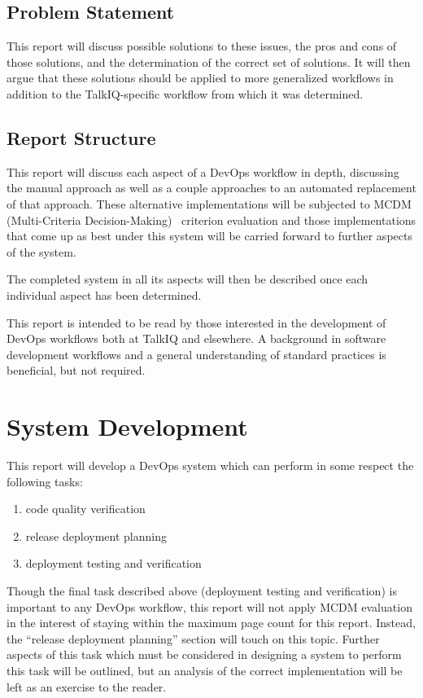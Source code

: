 \documentclass[12pt]{article}
\begin{document}
\subsection{Problem Statement}
This report will discuss possible solutions to these issues, the pros and cons of those solutions, and the determination of the correct set of solutions. It will then argue that these solutions should be applied to more generalized workflows in addition to the TalkIQ-specific workflow from which it was determined.

\subsection{Report Structure}
This report will discuss each aspect of a DevOps workflow in depth, discussing the manual approach as well as a couple approaches to an automated replacement of that approach. These alternative implementations will be subjected to MCDM (Multi-Criteria Decision-Making)~\cite{mcda} criterion evaluation and those implementations that come up as best under this system will be carried forward to further aspects of the system.

The completed system in all its aspects will then be described once each individual aspect has been determined.

This report is intended to be read by those interested in the development of DevOps workflows both at TalkIQ and elsewhere. A background in software development workflows and a general understanding of standard practices is beneficial, but not required.
\newpage


\section{System Development}
This report will develop a DevOps system which can perform in some respect the following tasks:
\begin{enumerate}
\item code quality verification
\item release deployment planning
\item deployment testing and verification
\end{enumerate}

Though the final task described above (deployment testing and verification) is important to any DevOps workflow, this report will not apply MCDM evaluation in the interest of staying within the maximum page count for this report. Instead, the ``release deployment planning'' section will touch on this topic. Further aspects of this task which must be considered in designing a system to perform this task will be outlined, but an analysis of the correct implementation will be left as an exercise to the reader.
\end{document}
